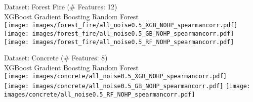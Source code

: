  \begin{figure*}[h]
  \centering
  \scriptsize
    Dataset: Forest Fire (\# Features: 12)\\
    XGBoost \hspace{1.7cm} Gradient Boosting \hspace{1cm} Random Forest \\
  
  \texttt{[image: images/forest\_fire/all\_noise0.5\_XGB\_NOHP\_spearmancorr.pdf]}
  \texttt{[image: images/forest\_fire/all\_noise0.5\_GB\_NOHP\_spearmancorr.pdf]}
  \texttt{[image: images/forest\_fire/all\_noise0.5\_RF\_NOHP\_spearmancorr.pdf]}
  
  Dataset: Concrete (\# Features: 8)\\
    XGBoost \hspace{1.7cm} Gradient Boosting \hspace{1cm} Random Forest \\
  
  \texttt{[image: images/concrete/all\_noise0.5\_XGB\_NOHP\_spearmancorr.pdf]}
  \texttt{[image: images/concrete/all\_noise0.5\_GB\_NOHP\_spearmancorr.pdf]}
  \texttt{[image: images/concrete/all\_noise0.5\_RF\_NOHP\_spearmancorr.pdf]}
  

\end{figure*}
